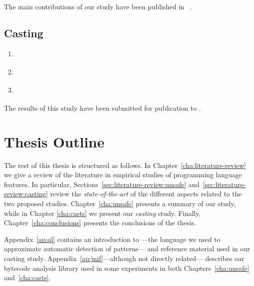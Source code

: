 The main contributions of our \unsafe{} \api{} study have been published in ~\citep{mastrangeloUseYourOwn2015}.

\subsection*{Casting}

\begin{enumerate}[label=$RQ/C\arabic*:$,leftmargin=3.4\parindent]
\item {\bf \crqA} \crqAdesc{}
\item {\bf \crqB} \crqBdesc{}
\item {\bf \crqC} \crqCdesc{}
\end{enumerate}

The results of this study have been submitted for publication to .


\section{Thesis Outline}

The rest of this thesis is structured as follows.
In Chapter~\ref{cha:literature-review} we give a review of the literature in empirical studies of programming language features.
In particular, Sections~\ref{sec:literature-review:unsafe} and~\ref{sec:literature-review:casting} review the \emph{state-of-the-art} of the different aspects related to the two proposed studies.
Chapter~\ref{cha:unsafe} presents a summary of our \unsafe{} study,
while in Chapter \ref{cha:casts} we present our \emph{casting} study.
Finally, Chapter~\ref{cha:conclusions} presents the conclusions of the thesis.

Appendix~\ref{ap:ql} contains an introduction to \ql{}%
---the language we used to approximate automatic detection of patterns---%
and reference material used in our casting study.
Appendix~\ref{ap:jnif}---although not directly related---%
describes our bytecode analysis library used in some experiments in both Chapters~\ref{cha:unsafe} and~\ref{cha:casts}.
